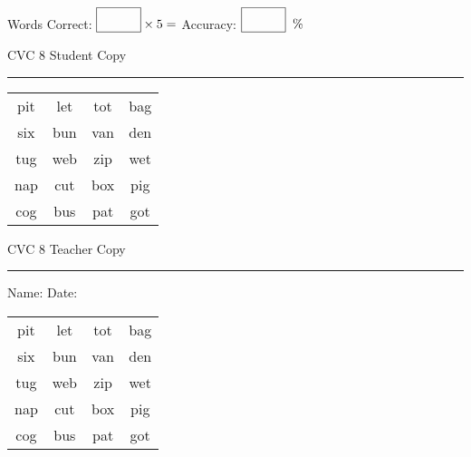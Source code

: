 \documentclass{memoir}
\begin{document}
\normalsize

Words Correct: $\fbox{\phantom{\huge 100}} \times 5 = $ Accuracy: $\fbox{\phantom{\huge 100}}\;\; \%$ 

\vfill

\newpage


\footnotesize \noindent
CVC 8 \hfill Student Copy
\smallskip
\hrule

\huge

\setlength{\tabcolsep}{14pt}
\def\arraystretch{2}

{\selectfont


\begin{vplace}[0.5]
\begin{center}
\begin{tabular}{cccc}
pit & let & tot & bag \\
six & bun & van & den \\
tug & web & zip & wet \\
nap & cut & box & pig \\
cog & bus & pat & got \\
\end{tabular}
\end{center}
\end{vplace}

}

\newpage

\footnotesize \noindent
CVC 8 \hfill Teacher Copy
\smallskip
\hrule

\normalsize

\vfill

\noindent
Name: \underline{\hspace{1.75in}} \hfill Date: \underline{\hspace{1in}}

\huge

{\selectfont


\begin{vplace}[0.5]
\begin{center}
\begin{tabular}{cccc}
pit & let & tot & bag \\
six & bun & van & den \\
tug & web & zip & wet \\
nap & cut & box & pig \\
cog & bus & pat & got \\
\end{tabular}
\end{center}
\end{vplace}



}
\end{document}
